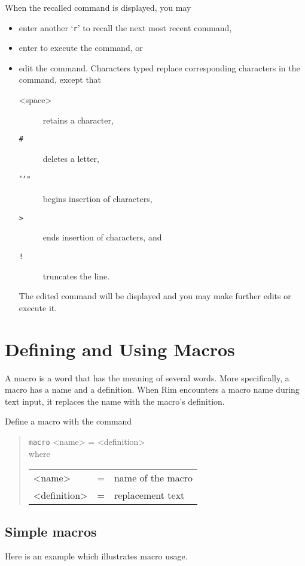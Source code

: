 \documentclass[11pt,a4paper]{report}
\def\I{\index}
\begin{document}
When the recalled command is displayed, you may
 
\begin{itemize}
\item enter another `\verb!r!' to recall the next most recent command,
\item enter  to execute the command, or
\item edit the command.  Characters typed replace corresponding
  characters in the command, except that
 
  \begin{description}
  \item[<space>] retains a character,
  \item[\tt \#] deletes a letter,
  \item["\tt \char`"] begins insertion of characters,
  \item[\tt >] ends insertion of characters, and
  \item[\tt !] truncates the line.
  \end{description}
 
  The edited command will be displayed and you may make further
  edits or execute it.
 
\end{itemize}
 
%
%
\chapter{Defining and Using Macros}
\I{macros|(}
\label{mac-chapter}
A macro is a word that has the meaning of several words.
More specifically, a macro has a name and a definition.
When Rim encounters a macro name during text input, it
replaces the name with the macro's definition.
 
Define a macro with the command
\I{macro@"macro"}
\begin{verse}
  \verb!macro! <name> = <definition> \\
where
 \begin{tabular}{lcl}
   <name> &=& name of the macro\\
   <definition> &=& replacement text
   \end{tabular}
  \end{verse}
\section{Simple macros}
Here is an example which illustrates macro usage.
 
\end{document}
